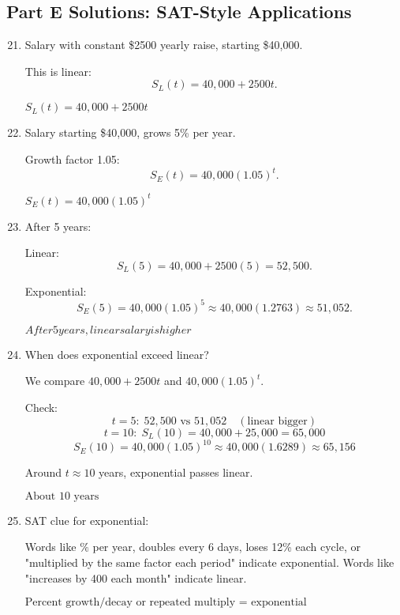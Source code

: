 \documentclass[12pt]{article}
\begin{document}
\subsection*{Part E Solutions: SAT-Style Applications}
\begin{enumerate}
  \setcounter{enumi}{20}
  \item Salary with constant \$2500 yearly raise, starting \$40{,}000.

  This is linear:
  \[
  S_L(t) = 40{,}000 + 2500t.
  \]

  \(\boxed{S_L(t)=40{,}000+2500t}\)

  \item Salary starting \$40{,}000, grows 5\% per year.

  Growth factor 1.05:
  \[
  S_E(t) = 40{,}000(1.05)^t.
  \]

  \(\boxed{S_E(t)=40{,}000(1.05)^t}\)

  \item After 5 years:

  Linear:
  \[
  S_L(5)=40{,}000+2500(5)=52{,}500.
  \]

  Exponential:
  \[
  S_E(5)=40{,}000(1.05)^5 \approx 40{,}000(1.2763)\approx 51{,}052.
  \]

  \(\boxed{After 5 years, linear salary is higher}\)

  \item When does exponential exceed linear?

  We compare \(40{,}000 + 2500t\) and \(40{,}000(1.05)^t\).

  Check:
  \[
  t=5:\; 52{,}500 \text{ vs } 51{,}052 \quad (\text{linear bigger})
  \]
  \[
  t=10:\; S_L(10)=40{,}000+25{,}000=65{,}000
  \]
  \[
  S_E(10)=40{,}000(1.05)^{10}\approx 40{,}000(1.6289)\approx 65{,}156
  \]

  Around \(t \approx 10\) years, exponential passes linear.

  \(\boxed{\text{About 10 years}}\)

  \item SAT clue for exponential:

  Words like \(\%\) per year, doubles every 6 days, loses 12\% each cycle, or "multiplied by the same factor each period" indicate exponential.  
  Words like "increases by 400 each month" indicate linear.

  \(\boxed{\text{Percent growth/decay or repeated multiply = exponential}}\)
\end{enumerate}
\end{document}

